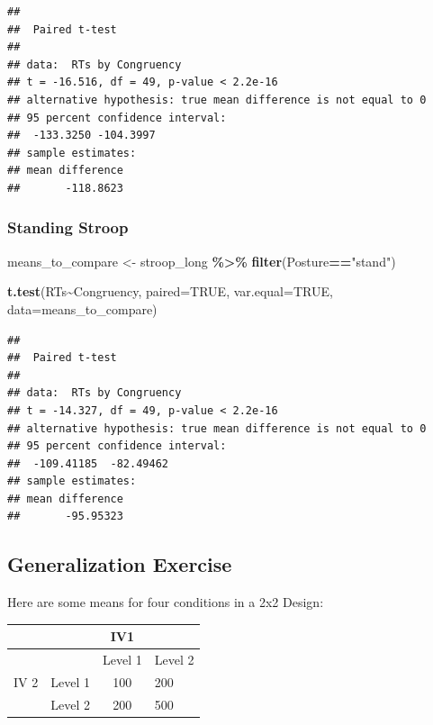 \documentclass[
]{book}
\newenvironment{Shaded}{\begin{snugshade}}{\end{snugshade}}
\newcommand{\AttributeTok}[1]{\textcolor[rgb]{0.13,0.29,0.53}{#1}}
\newcommand{\ConstantTok}[1]{\textcolor[rgb]{0.56,0.35,0.01}{#1}}
\newcommand{\FunctionTok}[1]{\textcolor[rgb]{0.13,0.29,0.53}{\textbf{#1}}}
\newcommand{\NormalTok}[1]{#1}
\newcommand{\OtherTok}[1]{\textcolor[rgb]{0.56,0.35,0.01}{#1}}
\newcommand{\SpecialCharTok}[1]{\textcolor[rgb]{0.81,0.36,0.00}{\textbf{#1}}}
\newcommand{\StringTok}[1]{\textcolor[rgb]{0.31,0.60,0.02}{#1}}
\begin{document}
\begin{verbatim}
## 
##  Paired t-test
## 
## data:  RTs by Congruency
## t = -16.516, df = 49, p-value < 2.2e-16
## alternative hypothesis: true mean difference is not equal to 0
## 95 percent confidence interval:
##  -133.3250 -104.3997
## sample estimates:
## mean difference 
##       -118.8623
\end{verbatim}

\hypertarget{standing-stroop}{%
\subsubsection{Standing Stroop}\label{standing-stroop}}

\begin{Shaded}
\begin{Highlighting}[]
\NormalTok{means\_to\_compare }\OtherTok{\textless{}{-}}\NormalTok{ stroop\_long }\SpecialCharTok{\%\textgreater{}\%}
                      \FunctionTok{filter}\NormalTok{(Posture}\SpecialCharTok{==}\StringTok{"stand"}\NormalTok{)}

\FunctionTok{t.test}\NormalTok{(RTs}\SpecialCharTok{\textasciitilde{}}\NormalTok{Congruency, }\AttributeTok{paired=}\ConstantTok{TRUE}\NormalTok{, }\AttributeTok{var.equal=}\ConstantTok{TRUE}\NormalTok{, }\AttributeTok{data=}\NormalTok{means\_to\_compare)}
\end{Highlighting}
\end{Shaded}

\begin{verbatim}
## 
##  Paired t-test
## 
## data:  RTs by Congruency
## t = -14.327, df = 49, p-value < 2.2e-16
## alternative hypothesis: true mean difference is not equal to 0
## 95 percent confidence interval:
##  -109.41185  -82.49462
## sample estimates:
## mean difference 
##       -95.95323
\end{verbatim}

\hypertarget{generalization-exercise-7}{%
\subsection{Generalization Exercise}\label{generalization-exercise-7}}

Here are some means for four conditions in a 2x2 Design:

\begin{longtable}[]{@{}llcl@{}}
\toprule\noalign{}
& & IV1 & \\
\midrule\noalign{}
\endhead
\bottomrule\noalign{}
\endlastfoot
& & Level 1 & Level 2 \\
IV 2 & Level 1 & 100 & 200 \\
& Level 2 & 200 & 500 \\
\end{longtable}
\end{document}
